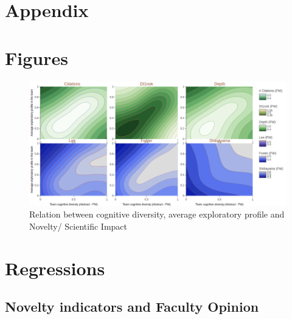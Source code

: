 
\newpage

\section{Appendix}
\section*{Figures}

    \begin{figure}[h!]
      \centering
      \includegraphics[width=1.1\textwidth]{2_chapter2/figures/intra.png}
      \caption{Relation between cognitive diversity, average exploratory profile and Novelty/ Scientific Impact}
      \label{figure:appendix2d}
    \end{figure}

\newpage
\section*{Regressions}

\subsection*{Novelty indicators and Faculty Opinion}

%
%

%







